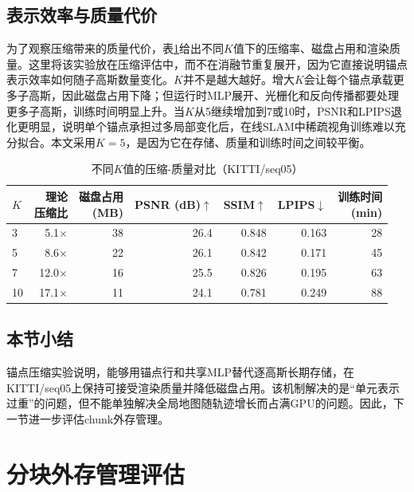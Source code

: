 \subsection{表示效率与质量代价}

为了观察压缩带来的质量代价，表\ref{tab:k_tradeoff}给出不同$K$值下的压缩率、磁盘占用和渲染质量。这里将该实验放在压缩评估中，而不在消融节重复展开，因为它直接说明锚点表示效率如何随子高斯数量变化。$K$并不是越大越好。增大$K$会让每个锚点承载更多子高斯，因此磁盘占用下降；但运行时MLP展开、光栅化和反向传播都要处理更多子高斯，训练时间明显上升。当$K$从5继续增加到7或10时，PSNR和LPIPS退化更明显，说明单个锚点承担过多局部变化后，在线SLAM中稀疏视角训练难以充分拟合。本文采用$K=5$，是因为它在存储、质量和训练时间之间较平衡。

\begin{table}[htbp]
\centering
\caption[不同K值的压缩-质量对比]{不同$K$值的压缩-质量对比（KITTI/seq05）}
\label{tab:k_tradeoff}
\begin{tabular}{lrrrrrr}
\toprule
\textbf{$K$} & \makecell[c]{\textbf{理论}\\\textbf{压缩比}} & \makecell[c]{\textbf{磁盘占用}\\\textbf{(MB)}} & \makecell[c]{\textbf{PSNR}\\\textbf{(dB)$\uparrow$}} & \textbf{SSIM$\uparrow$} & \textbf{LPIPS$\downarrow$} & \makecell[c]{\textbf{训练时间}\\\textbf{(min)}} \\
\midrule
3  & 5.1$\times$ & 38 & 26.4 & 0.848 & 0.163 & 28 \\
5  & 8.6$\times$ & 22 & 26.1 & 0.842 & 0.171 & 45 \\
7  & 12.0$\times$ & 16 & 25.5 & 0.826 & 0.195 & 63 \\
10 & 17.1$\times$ & 11 & 24.1 & 0.781 & 0.249 & 88 \\
\bottomrule
\end{tabular}
\end{table}

\subsection{本节小结}

锚点压缩实验说明，\ScaffoldChunGS 能够用锚点行和共享MLP替代逐高斯长期存储，在KITTI/seq05上保持可接受渲染质量并降低磁盘占用。该机制解决的是“单元表示过重”的问题，但不能单独解决全局地图随轨迹增长而占满GPU的问题。因此，下一节进一步评估chunk外存管理。

\section{分块外存管理评估}

